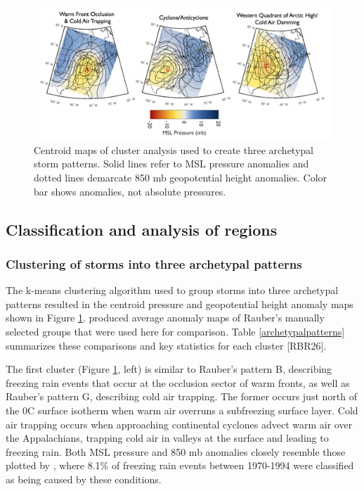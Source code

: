 \documentclass[twocol]{ametsoc}
\begin{document}
\begin{figure}
\centering
\includegraphics[width=1\textwidth]{Cluster_Centroids.png}
\caption{\label{fig:centroids} Centroid maps of cluster analysis  used to create three archetypal storm patterns. Solid lines refer to MSL pressure anomalies and dotted lines demarcate 850 mb geopotential height anomalies. Color bar shows anomalies, not absolute pressures.}
\end{figure}

\subsection{Classification and analysis of regions}
\subsubsection{Clustering of storms into three archetypal patterns}
The k-means clustering algorithm used to group storms into three archetypal patterns resulted in the centroid pressure and geopotential height anomaly maps shown in Figure \ref{fig:centroids}. \citet{erfani2012automated} produced average anomaly maps of Rauber's manually selected groups that were used here for comparison. Table \ref{archetypalpatterns} summarizes these comparisons and key statistics for each cluster  [RBR26].

The first cluster (Figure \ref{fig:centroids}, left) is similar to Rauber's pattern B, describing freezing rain events that occur at the occlusion sector of warm fronts, as well as Rauber's pattern G, describing cold air trapping. The former occurs just north of the 0\degree C surface isotherm when warm air overruns a subfreezing surface layer. Cold air trapping occurs when approaching continental cyclones advect warm air over the Appalachians, trapping cold air in valleys at the surface and leading to freezing rain. Both MSL pressure and 850 mb anomalies closely resemble those plotted by \citet{rauber2001synoptic}, where  8.1\% of freezing rain events between 1970-1994 were classified as being caused by these conditions. 
\end{document}
